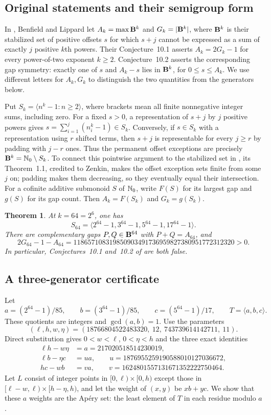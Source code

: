\documentclass[11pt,a4paper]{article}
\newtheorem{SourceRbcTtheorem}{Theorem}
\begin{document}
\subsection{Original statements and their semigroup form}
In \cite[\S10.1]{R12T:BL2}, Benfield and Lippard let $A_k=\max\mathbf B^k$ and $G_k=|\mathbf B^k|$, where $\mathbf B^k$ is their stabilized set of positive offsets $s$ for which $s+j$ cannot be expressed as a sum of exactly $j$ positive $k$th powers. Their Conjecture~10.1 asserts $A_k=2G_k-1$ for every power-of-two exponent $k\ge2$. Conjecture~10.2 asserts the corresponding gap symmetry: exactly one of $s$ and $A_k-s$ lies in $\mathbf B^k$, for $0\le s\le A_k$. We use different letters for $A_k,G_k$ to distinguish the two quantities from the generators below.

Put $S_k=\langle n^k-1:n\ge2\rangle$, where brackets mean all finite nonnegative integer sums, including zero. For a fixed $s>0$, a representation of $s+j$ by $j$ positive powers gives $s=\sum_{i=1}^j(n_i^k-1)\in S_k$. Conversely, if $s\in S_k$ with a representation using $r$ shifted terms, then $s+j$ is representable for every $j\ge r$ by padding with $j-r$ ones. Thus the permanent offset exceptions are precisely $\mathbf B^k=\mathbb N_0\setminus S_k$. To connect this pointwise argument to the stabilized set in \cite[\S10.2]{R12T:BL2}, its Theorem~1.1, credited to Zenkin, makes the offset exception sets finite from some $j$ on; padding makes them decreasing, so they eventually equal their intersection. For a cofinite additive submonoid $S$ of $\mathbb N_0$, write $F(S)$ for its largest gap and $g(S)$ for its gap count. Then $A_k=F(S_k)$ and $G_k=g(S_k)$.

\begin{SourceRbcTtheorem}\label{R12T:main}
At $k=64=2^6$, one has
\[
S_{64}=\langle 2^{64}-1,3^{64}-1,5^{64}-1,17^{64}-1\rangle.
\]
There are complementary gaps $P,Q\in\mathbf B^{64}$ with $P+Q=A_{64}$, and
\[
2G_{64}-1-A_{64}=118657108319850903491736959827380951772312320>0.
\]
In particular, Conjectures~10.1 and~10.2 of \cite{R12T:BL2} are both false.
\end{SourceRbcTtheorem}

\subsection{A three-generator certificate}
Let
\[
a=(2^{64}-1)/85,\qquad b=(3^{64}-1)/85,\qquad
c=(5^{64}-1)/17,\qquad T=\langle a,b,c\rangle.
\]
These quotients are integers and $\gcd(a,b)=1$. Use the parameters
\[
(\ell,h,w,\eta)=(18766804522483320,\ 12,\ 743739614142711,\ 11).
\]
Direct substitution gives $0<w<\ell$, $0<\eta<h$ and the three exact identities
\begin{align*}
\ell h-w\eta&=a=217020518514230019,\\
\ell b-\eta c&=ua,\qquad u=1876955259190588010127036672,\\
hc-wb&=va,\qquad v=1624801557131671352222750464.
\end{align*}
Let $L$ consist of integer points in $[0,\ell)\times[0,h)$ except those in $[\ell-w,\ell)\times[h-\eta,h)$, and let the weight of $(x,y)$ be $xb+yc$. We show that these $a$ weights are the Ap\'ery set: the least element of $T$ in each residue modulo $a$.
\end{document}
